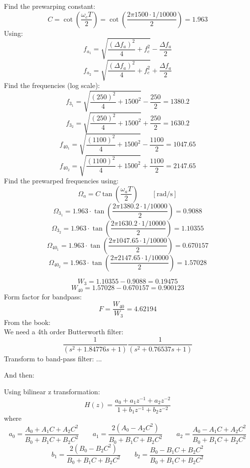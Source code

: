 Find the prewarping constant:
$$C=\cot\left(\frac{\omega_cT}{2}\right)=\cot\left(\frac{2\pi1500\cdot 1/10000}{2}\right)=1.963$$
Using:
$$f_{a_1}=\sqrt{\frac{(\Delta f_a)^2}{4}+f_c^2}-\frac{\Delta f_a}{2}$$
$$f_{a_2}=\sqrt{\frac{(\Delta f_a)^2}{4}+f_c^2}+\frac{\Delta f_a}{2}$$
Find the frequencies (log scale):
$$f_{3_1}=\sqrt{\frac{(250)^2}{4}+1500^2}-\frac{250}{2}=1380.2$$
$$f_{3_2}=\sqrt{\frac{(250)^2}{4}+1500^2}+\frac{250}{2}=1630.2$$
$$f_{40_1}=\sqrt{\frac{(1100)^2}{4}+1500^2}-\frac{1100}{2}=1047.65$$
$$f_{40_2}=\sqrt{\frac{(1100)^2}{4}+1500^2}+\frac{1100}{2}=2147.65$$
Find the prewarped frequencies using:
$$\Omega_a=C\tan\left({\frac{\omega_a T}{2}}\right)\qquad\mathrm{\left[rad/s\right]}$$
$$\Omega_{3_1}=1.963\cdot\tan\left({\frac{2\pi 1380.2\cdot 1/10000}{2}}\right)=0.9088$$
$$\Omega_{3_2}=1.963\cdot\tan\left({\frac{2\pi 1630.2\cdot 1/10000}{2}}\right)=1.10355$$
$$\Omega_{40_1}=1.963\cdot\tan\left({\frac{2\pi 1047.65\cdot 1/10000}{2}}\right)=0.670157$$
$$\Omega_{40_2}=1.963\cdot\tan\left({\frac{2\pi 2147.65\cdot 1/10000}{2}}\right)=1.57028$$

$$W_3=1.10355-0.9088=0.19475$$
$$W_{40}=1.57028-0.670157=0.900123$$
Form factor for bandpass:
$$F=\frac{W_{40}}{W_3}=4.62194$$
From the book:\\
We need a 4th order Butterworth filter:
$$\frac{1}{(s^2+1.84776s+1)}\frac{1}{(s^2+0.76537s+1)}$$
Transform to band-pass filter: ...

And then:

Using bilinear z transformation:
$$H(z)={\frac{a_{0}+a_{1}z^{-1}+a_{2}z^{-2}}{1+b_{1}z^{-1}+b_{2}z^{-2}}}$$
where
$$a_{0}=\frac{A_{0}+A_{1}C+A_{2}C^{2}}{B_{0}+B_{1}C+B_{2}C^{2}}\qquad a_{1}=\frac{2(A_{0}-A_{2}C^{2})}{B_{0}+B_{1}C+B_{2}C^{2}}\qquad a_{2}=\frac{A_{0}-A_{1}C+A_{2}C^{2}}{B_{0}+B_{1}C+B_{2}C^{2}}$$
$$b_{1}=\frac{2(B_{0}-B_{2}C^{2})}{B_{0}+B_{1}C+B_{2}C^{2}}\qquad b_{2}=\frac{B_{0}-B_{1}C+B_{2}C^{2}}{B_{0}+B_{1}C+B_{2}C^{2}}$$

